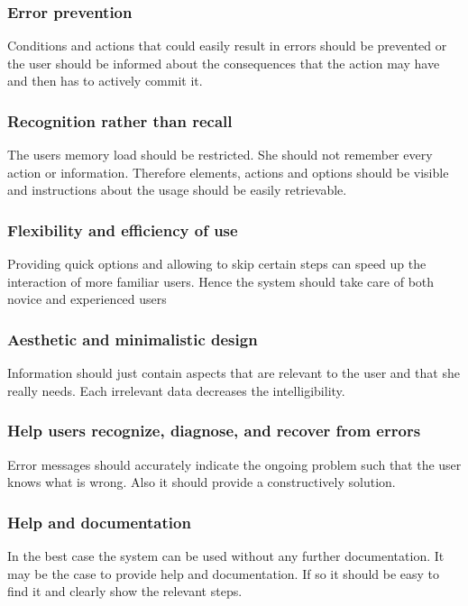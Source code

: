\subsubsection{Error prevention}
Conditions and actions that could easily result in errors should be prevented or the user should be informed about the consequences that the action may have and then has to actively commit it.
\subsubsection{Recognition rather than recall}
The users memory load should be restricted. She should not remember every action or information. Therefore elements, actions and options should be visible and instructions about the usage should be easily retrievable.
\subsubsection{Flexibility and efficiency of use}
Providing quick options and allowing to skip certain steps can speed up the interaction of more familiar users. Hence the system should take care of both novice and experienced users
\subsubsection{Aesthetic and minimalistic design}
Information should just contain aspects that are relevant to the user and that she really needs. Each irrelevant data decreases the intelligibility.
\subsubsection{Help users recognize, diagnose, and recover from errors}
Error messages should accurately indicate the ongoing problem such that the user knows what is wrong. Also it should provide a constructively solution.
\subsubsection{Help and documentation}
In the best case the system can be used without any further documentation. It may be the case to provide help and documentation. If so it should be easy to find it and clearly show the relevant steps.


